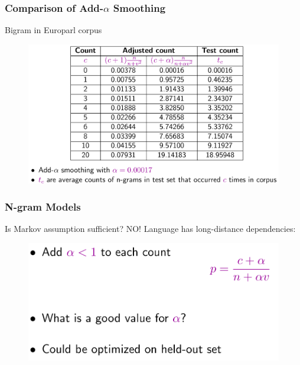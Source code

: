 \documentclass{beamer}
\begin{document}
\begin{frame}\frametitle{Comparison of Add-$\alpha$ Smoothing}

\begin{block}{Bigram in Europarl corpus}

\begin{figure}
\includegraphics[width=0.9\linewidth]{figure/bigram_alpha_smoothing.pdf}
\label{fig:bigram_alpha_smoothing}
\end{figure}

\end{block}
\end{frame}


\begin{frame}\frametitle{N-gram Models}

\begin{block}{Is Markov assumption sufficient? \alert{NO!}}
Language has long-distance dependencies:

\begin{figure}
\includegraphics[width=0.6\linewidth]{figure/add_alpha_smoothing.pdf}
\label{fig:add_alpha_smoothing}
\end{figure}
\end{block}

\end{frame}
\end{document}
